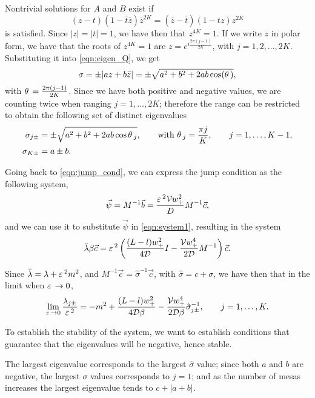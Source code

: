 Nontrivial solutions for $A$ and $B$ exist if 
% 
\[
  (z-t)(1-\bar{t}\bar{z})\bar{z}^{2K} = (\bar{z}-\bar{t})(1-tz)z^{2K}
\]
% 
is satisfied. Since $|z| = |t| = 1$, we have then that $z^{4K} = 1$. If we write $z$ in polar form, we have that the roots of $z^{4K} = 1$ are $z=e^{i\frac{2\pi(j-1)}{2K}}$, with $j=1,2,\hdots,2K$. Substituting it into \eqref{eqn:eigen_Q}, we get
% 
\[
  \sigma = \pm|az + b\bar{z}| = \pm\sqrt{a^2 + b^2 + 2ab\cos(\theta\,)},
\]
% 
with $\theta\, = \frac{2\pi(j-1)}{2K}$. Since we have both positive and negative values, we are counting twice when ranging $j=1,\hdots,2K$; therefore the range can be restricted to obtain the following set of distinct eigenvalues
% 
\begin{equation*}
\begin{split}
\begin{aligned}
  \sigma_{j\pm} &= \pm\sqrt{a^2 + b^2 + 2ab\cos\theta\,_j},\qquad\text{with  }\theta\,_j=\frac{\pi j}{K},\qquad j=1,	\hdots,K-1,\\
  \sigma_{K\pm} &= a\pm b.
\end{aligned}
\end{split}
\end{equation*}

Going back to \eqref{eqn:jump_cond}, we can express the jump condition as the following system,
% 
\[
  \vec{\psi} = M^{-1}\vec{b} =\frac{\varepsilon\,^2\mathcal{V} w_+^2}{D}M^{-1}\vec{c},
\]
% 
and we can use it to substitute $\vec{\psi}$ in \eqref{eqn:system1}, resulting in the system
%
\begin{equation}
\label{eqn:Kmesa_gms}
  \bar{\lambda}\beta\vec{c} = \varepsilon\,^2\left(\frac{(L-l)w_+^2}{4\mathcal{D}}I - \frac{\mathcal{V} w_+^4}{2\mathcal{D}}M^{-1}\right)\vec{c}.
\end{equation}
% 

Since $\bar{\lambda} = \lambda + \varepsilon\,^2m^2$, and $M^{-1}\vec{c} = \hat\sigma^{-1}\vec{c}$, with $\hat\sigma = c+\sigma$, we have then that in the limit when $\varepsilon\,\rightarrow 0$,
% 
\begin{equation*}
  \lim_{\varepsilon\,\rightarrow0}\frac{\lambda_{j\pm}}{\varepsilon\,^2} = -m^2 + \frac{(L-l)w_+^2}{4\mathcal{D}\beta} - \frac{\mathcal{V} w_+^4}{2\mathcal{D}\beta}\hat\sigma_{j\pm}^{-1},\qquad j=1,\hdots,K.
\end{equation*}

To establish the stability of the system, we want to establish conditions that guarantee that the eigenvalues will be negative, hence stable. 

The largest eigenvalue corresponds to the largest $\hat\sigma$ value; since both $a$ and $b$ are negative, the largest $\sigma$ values corresponds to $j=1$; and as the number of mesas increases the largest eigenvalue tends to $c+|a+b|$. 

